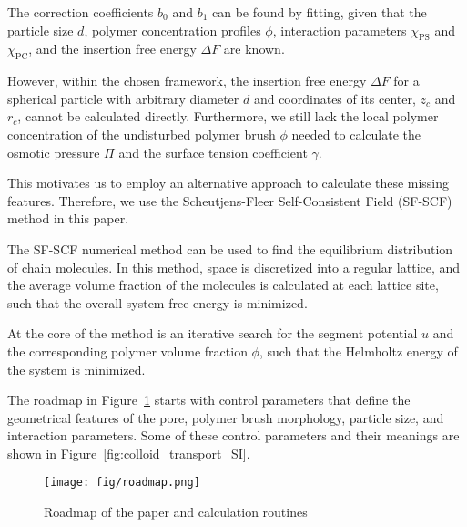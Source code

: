 \documentclass[10pt, a4paper]{article}
\begin{document}
\begin{multicols}{2}
The correction coefficients $b_0$ and $b_1$ can be found by fitting, given that the particle size $d$, polymer concentration profiles $\phi$, interaction parameters $\chi_{\text{PS}}$ and $\chi_{\text{PC}}$, and the insertion free energy $\Delta F$ are known.

However, within the chosen framework, the insertion free energy $\Delta F$ for a spherical particle with arbitrary diameter $d$ and coordinates of its center, $z_c$ and $r_c$, cannot be calculated directly.
Furthermore, we still lack the local polymer concentration of the undisturbed polymer brush $\phi$ needed to calculate the osmotic pressure $\Pi$ and the surface tension coefficient $\gamma$.


This motivates us to employ an alternative approach to calculate these missing features.
Therefore, we use the Scheutjens-Fleer Self-Consistent Field (SF-SCF) method in this paper.

The SF-SCF numerical method can be used to find the equilibrium distribution of chain molecules.
In this method, space is discretized into a regular lattice, and the average volume fraction of the molecules is calculated at each lattice site, such that the overall system free energy is minimized.

At the core of the method is an iterative search for the segment potential $u$ and the corresponding polymer volume fraction $\phi$, such that the Helmholtz energy of the system is minimized.

The roadmap in Figure~\ref{fig:paper_roadmap} starts with control parameters that define the geometrical features of the pore, polymer brush morphology, particle size, and interaction parameters.
Some of these control parameters and their meanings are shown in Figure~\ref{fig:colloid_transport_SI}.

\begin{figure}[H]
    \centering
    \texttt{[image: fig/roadmap.png]}
    \caption{Roadmap of the paper and calculation routines}
    \label{fig:paper_roadmap}
\end{figure}

\end{multicols}

\end{document}
